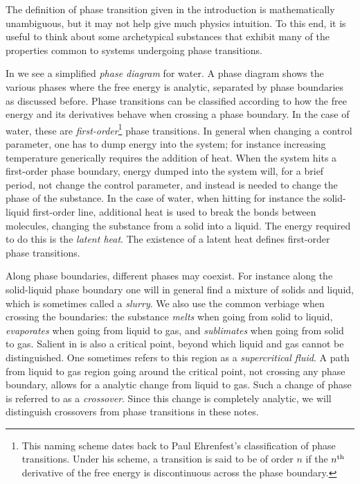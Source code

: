 The definition of phase transition given in the introduction is mathematically
unambiguous, but it may not help give much physics intuition. To this end, it is
useful to think about some archetypical substances that exhibit many of the
properties common to systems undergoing phase transitions.

In  we see a simplified {\it phase diagram} for water. A phase diagram shows the various phases where
the free energy is analytic, separated by phase boundaries as discussed before.
Phase transitions can be classified according to how the free energy and its
derivatives behave when crossing a phase boundary. In the case of water, these
are {\it first-order}\footnote{This naming scheme dates back to Paul Ehrenfest's
classification of phase transitions. Under his scheme, a transition is said to
be of order $n$ if the $n{}^{\rm th}$ derivative of the free energy is discontinuous
across the phase boundary.} phase transitions.
In general when changing a control parameter, one has to dump energy into the
system; for instance increasing temperature generically requires the addition of
heat. When the system hits a first-order phase boundary, energy dumped into the
system will, for a brief period, not change the control parameter, and instead
is needed to change the phase of the substance. In the case of water, when
hitting for instance the solid-liquid first-order line, additional heat is used
to break the bonds between molecules, changing the substance from a solid into a
liquid. The energy required to do this is the {\it latent heat}. The existence of a latent heat defines first-order phase transitions.

Along phase boundaries, different phases may coexist. For instance along the
solid-liquid phase boundary one will in general find a mixture of solids and
liquid, which is sometimes called a {\it slurry}. We also use
the common verbiage when crossing the boundaries: the substance {\it
melts} when going from solid to liquid, {\it
evaporates} when going
from liquid to gas, and {\it sublimates} when going from solid
to gas. Salient in  is also a critical point, beyond
which liquid and gas cannot be distinguished. One sometimes refers to this
region as a {\it supercritical fluid}. A path from
liquid to gas region going around the critical point, not crossing any phase
boundary, allows for a analytic change from liquid to gas. Such a change of
phase is referred to as a {\it crossover}. Since this change is
completely analytic, we will distinguish crossovers from phase transitions in
these notes. 

